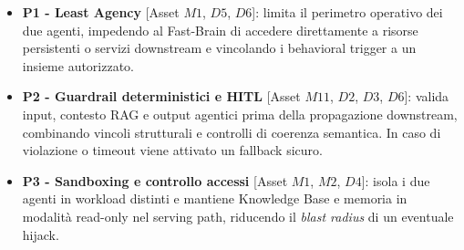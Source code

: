 \documentclass[11pt,a4paper]{article}
\begin{document}
\begin{itemize}
    \item \textbf{P1 - Least Agency} [Asset $M1$, $D5$, $D6$]: limita il perimetro operativo dei due agenti, impedendo al Fast-Brain di accedere direttamente a risorse persistenti o servizi downstream e vincolando i behavioral trigger a un insieme autorizzato.
    
    \item \textbf{P2 - Guardrail deterministici e HITL} [Asset $M11$, $D2$, $D3$, $D6$]:
    valida input, contesto RAG e output agentici prima della propagazione
    downstream, combinando vincoli strutturali e controlli di coerenza
    semantica. In caso di violazione o timeout viene attivato un
    fallback sicuro.

    \item \textbf{P3 - Sandboxing e controllo accessi} [Asset $M1$, $M2$, $D4$]:
        isola i due agenti in workload distinti e mantiene Knowledge Base e
    memoria in modalità read-only nel serving path, riducendo il
    \emph{blast radius} di un eventuale hijack.


\end{itemize}
\end{document}

